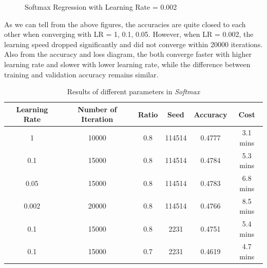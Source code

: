 \documentclass{article}
\begin{document}
\begin{figure}[htbp]
  \centering
  \caption{Softmax Regression with Learning Rate = 0.002}
\end{figure}

As we can tell from the above figures, the accuracies are quite closed to each other when converging with LR = 1, 0.1, 0.05. However, when LR = 0.002, the learning speed dropped significantly and did not converge within 20000 iterations. Also from the accuracy and loss diagram, the both converge faster with higher learning rate and slower with lower learning rate, while the difference between training and validation accuracy remains similar.

\begin{table}[!htbp]
\setlength{\abovecaptionskip}{+0.2cm}
\setlength{\belowcaptionskip}{+0.2cm}
\centering
\caption{Results of different parameters in \textit{Softmax}}
\begin{tabular}{cccccc}
\toprule
\textbf{Learning Rate} & \textbf{Number of Iteration} & \textbf{Ratio} & \textbf{Seed} & \textbf{Accuracy} & \textbf{Cost} \\ 
\midrule
    1      & 10000 & 0.8 & 114514 & 0.4777 & 3.1 mins \\
    0.1    & 15000 & 0.8 & 114514 & 0.4784 & 5.3 mins \\
    0.05   & 15000 & 0.8 & 114514 & 0.4783 & 6.8 mins \\
    0.002  & 20000 & 0.8 & 114514 & 0.4766 & 8.5 mins \\
    0.1    & 15000 & 0.8 & 2231   & 0.4751 & 5.4 mins \\
    0.1    & 15000 & 0.7 & 2231   & 0.4619 & 4.7 mins \\
\bottomrule
\end{tabular}
\end{table}
\end{document}
